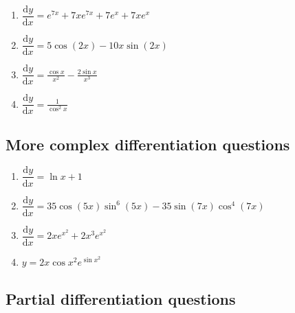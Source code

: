 \documentclass[
]{book}
\providecommand{\tightlist}{%
  \setlength{\itemsep}{0pt}\setlength{\parskip}{0pt}}
\begin{document}
\begin{enumerate}
\def\labelenumi{\arabic{enumi}.}
\tightlist
\item
  \(\dfrac{\textrm{d}y}{\textrm{d}x}=e^{7x}+7xe^{7x}+ 7e^x+7xe^x\)
\item
  \(\dfrac{\textrm{d}y}{\textrm{d}x}=5 \cos (2x)-10x \sin (2x)\)
\item
  \(\dfrac{\textrm{d}y}{\textrm{d}x}= \frac{\cos x}{x^2}-\frac{2\sin x}{x^3}\)
\item
  \(\dfrac{\textrm{d}y}{\textrm{d}x}=\frac{1}{\cos^2 x}\)
\end{enumerate}

\hypertarget{more-complex-differentiation-questions-1}{%
\subsection{More complex differentiation questions}\label{more-complex-differentiation-questions-1}}

\begin{enumerate}
\def\labelenumi{\arabic{enumi}.}
\tightlist
\item
  \(\dfrac{\textrm{d}y}{\textrm{d}x}=\ln x +1\)
\item
  \(\dfrac{\textrm{d}y}{\textrm{d}x}=35 \cos (5x) \sin^6 (5x) - 35 \sin (7x) \cos^4(7x)\)
\item
  \(\dfrac{\textrm{d}y}{\textrm{d}x}=2x e^{x^2}+ 2x^3e^{x^2}\)
\item
  \(y=2x \cos x^2 e^{\sin x^2}\)
\end{enumerate}

\hypertarget{partial-differentiation-questions-1}{%
\subsection{Partial differentiation questions}\label{partial-differentiation-questions-1}}
\end{document}
